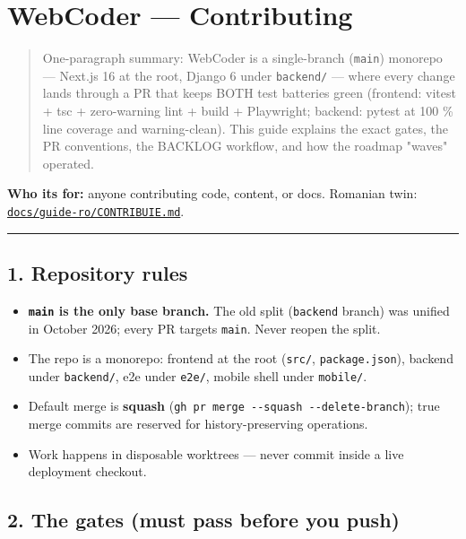 \documentclass[
]{article}
\author{}
\date{}
\providecommand{\tightlist}{%
  \setlength{\itemsep}{0pt}\setlength{\parskip}{0pt}}
\begin{document}
{
\setcounter{tocdepth}{2}
\tableofcontents
}
\section{WebCoder --- Contributing}\label{webcoder--contributing}

\begin{quote}
One-paragraph summary: WebCoder is a single-branch (\texttt{main})
monorepo --- Next.js 16 at the root, Django 6 under \texttt{backend/}
--- where every change lands through a PR that keeps BOTH test batteries
green (frontend: vitest + tsc + zero-warning lint + build + Playwright;
backend: pytest at 100 \% line coverage and warning-clean). This guide
explains the exact gates, the PR conventions, the BACKLOG workflow, and
how the roadmap "waves" operated.
\end{quote}

\textbf{Who it\textquotesingle s for:} anyone contributing code,
content, or docs. Romanian twin:
\href{../guide-ro/CONTRIBUIE.md}{\texttt{docs/guide-ro/CONTRIBUIE.md}}.

\begin{center}\rule{0.5\linewidth}{0.5pt}\end{center}

\subsection{1. Repository rules}\label{1-repository-rules}

\begin{itemize}
\tightlist
\item
  \textbf{\texttt{main} is the only base branch.} The old split
  (\texttt{backend} branch) was unified in October 2026; every PR
  targets \texttt{main}. Never reopen the split.
\item
  The repo is a monorepo: frontend at the root (\texttt{src/},
  \texttt{package.json}), backend under \texttt{backend/}, e2e under
  \texttt{e2e/}, mobile shell under \texttt{mobile/}.
\item
  Default merge is \textbf{squash}
  (\texttt{gh\ pr\ merge\ -\/-squash\ -\/-delete-branch}); true merge
  commits are reserved for history-preserving operations.
\item
  Work happens in disposable worktrees --- never commit inside a live
  deployment checkout.
\end{itemize}

\subsection{2. The gates (must pass before you
push)}\label{2-the-gates-must-pass-before-you-push}
\end{document}
